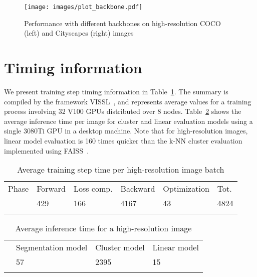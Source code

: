 \documentclass{bmvc2k}
\begin{document}
\begin{figure}
\centering
\texttt{[image: images/plot\_backbone.pdf]}
\caption{Performance with different backbones on high-resolution COCO (left) and Cityscapes (right) images}
\label{fig:backbones}
\end{figure}

\section{Timing information}

We present training step timing information in Table~\ref{tab:training_step_timings}. The summary is compiled by the framework VISSL~\cite{goyal2021vissl}, and represents average values for a training process involving 32 V100 GPUs distributed over 8 nodes. Table~\ref{tab:inference_step_timings} shows the average inference time per image for cluster and linear evaluation models using a single 3080Ti GPU in a desktop machine. Note that for high-resolution images, linear model evaluation is 160 times quicker than the k-NN cluster evaluation implemented using FAISS~\cite{Johnson2019FAISS}.

\setlength{\tabcolsep}{4pt}
\begin{table}
\begin{center}
\caption{Average training step time per high-resolution image batch}
\begin{tabular}{llllll}
\hline\noalign{\smallskip}
 Phase & Forward & Loss comp. & Backward & Optimization & Tot. \\
 \noalign{\smallskip}
 \hline
 [msec] & 429 & 166 & 4167 & 43 & 4824 \\ 
 \hline
\label{tab:training_step_timings}
\end{tabular}
\end{center}
\end{table}
\setlength{\tabcolsep}{1.4pt}

\setlength{\tabcolsep}{4pt}
\begin{table}
\begin{center}
\caption{Average inference time for a high-resolution image}
\begin{tabular}{llll}
\hline\noalign{\smallskip}
  & Segmentation model & Cluster model & Linear model \\
 \noalign{\smallskip}
 \hline
 [msec] & 57 & 2395 & 15 \\ 
 \hline
\label{tab:inference_step_timings}
\end{tabular}
\end{center}
\end{table}
\setlength{\tabcolsep}{1.4pt}
\end{document}
